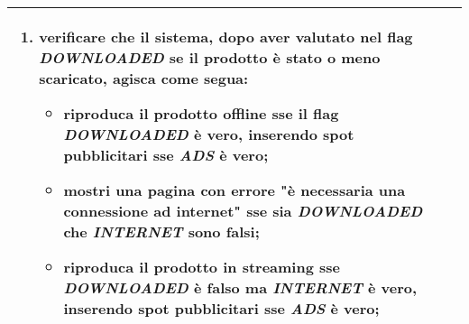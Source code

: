 \begin{table}[hb]
\begin{tabular}{ |p{2cm}|p{10cm}|  }
\begin{enumerate}[nosep, topsep=0pt]
            \item verificare che il sistema, dopo aver valutato nel flag \emph{DOWNLOADED} se il prodotto è stato o meno scaricato, agisca come segua:
                  \begin{itemize}
                      \item riproduca il prodotto offline sse il flag \emph{DOWNLOADED} è vero, inserendo spot pubblicitari sse \emph{ADS} è vero;
                      \item mostri una pagina con errore "è necessaria una connessione ad internet" sse sia \emph{DOWNLOADED} che \emph{INTERNET} sono falsi;
                      \item riproduca il prodotto in streaming sse \emph{DOWNLOADED} è falso ma \emph{INTERNET} è vero, inserendo spot pubblicitari sse \emph{ADS} è vero;
                  \end{itemize}
        \end{enumerate}
        \\\hline
    \end{tabular}
\end{table}

